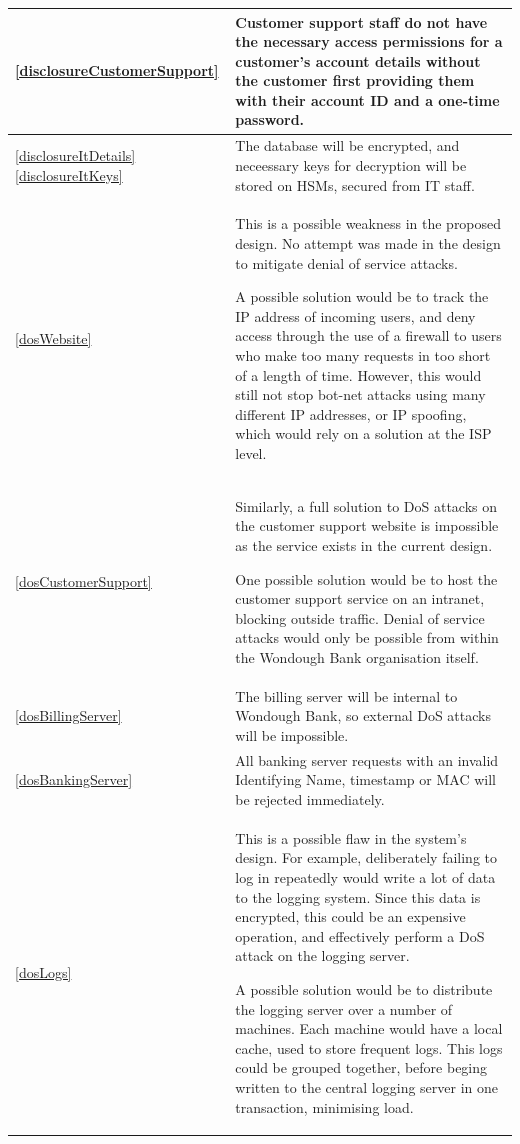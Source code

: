 \begin{longtable}{|| p{} | p{} ||}
    \\ \hline \ref{disclosureCustomerSupport} &
        Customer support staff do not have the necessary access permissions for a customer's account details without the customer first providing them with their account ID and a one-time password.
    \\ \hline \ref{disclosureItDetails} \ref{disclosureItKeys} &
        The database will be encrypted, and neceessary keys for decryption will be stored on HSMs, secured from IT staff.
    \\ \hline \textcolor{red}{\ref{dosWebsite}} &
        This is a possible weakness in the proposed design. No attempt was made in the design to mitigate denial of service attacks.

        A possible solution would be to track the IP address of incoming users, and deny access through the use of a firewall to users who make too many requests in too short of a length of time. However, this would still not stop bot-net attacks using many different IP addresses, or IP spoofing, which would rely on a solution at the ISP level.
    \\ \hline \textcolor{red}{\ref{dosCustomerSupport}} &
        Similarly, a full solution to DoS attacks on the customer support website is impossible as the service exists in the current design.

        One possible solution would be to host the customer support service on an intranet, blocking outside traffic. Denial of service attacks would only be possible from within the Wondough Bank organisation itself.
    \\ \hline \ref{dosBillingServer} &
        The billing server will be internal to Wondough Bank, so external DoS attacks will be impossible. 
    \\ \hline \ref{dosBankingServer} &
        All banking server requests with an invalid Identifying Name, timestamp or MAC will be rejected immediately.
    \\ \hline \textcolor{red}{\ref{dosLogs}} &
        This is a possible flaw in the system's design. For example, deliberately failing to log in repeatedly would write a lot of data to the logging system. Since this data is encrypted, this could be an expensive operation, and effectively perform a DoS attack on the logging server.

        A possible solution would be to distribute the logging server over a number of machines. Each machine would have a local cache, used to store frequent logs. This logs could be grouped together, before beging written to the central logging server in one transaction, minimising load.


\end{longtable}
